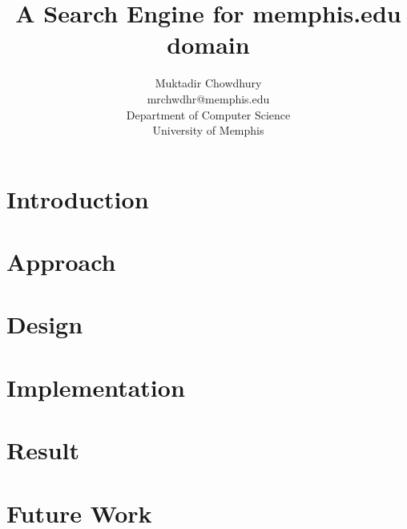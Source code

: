 \documentclass[11pt]{article}
\begin{document}
\title{A Search Engine for memphis.edu domain}
\author{
{\rm Muktadir Chowdhury} \\
mrchwdhr@memphis.edu \\
Department of Computer Science \\
University of Memphis\\
}
\maketitle
\thispagestyle{empty}

\section{Introduction}


\section{Approach}


\section{Design}


\section{Implementation}


\section{Result}


\section{Future Work}




\end{document}
